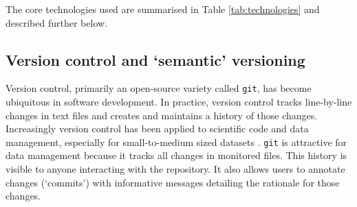 \documentclass[a4paper,11pt]{article}
\begin{document}
The core technologies used are summarised in Table \ref{tab:technologies} and described further below.

\subsection{Version control and `semantic' versioning}



Version control, primarily an open-source variety called \texttt{git}, has become ubiquitous in software development. In practice, version control tracks line-by-line changes in text files and creates and maintains a history of those changes. Increasingly version control has been applied to scientific code and data management, especially for small-to-medium sized datasets \citep{Ram-2013, Perkel-2016}. \texttt{git} is attractive for data management because it tracks all changes in monitored files. This history is visible to anyone interacting with the repository. It also allows users to annotate changes (`commits') with informative messages detailing the rationale for those changes.  
\end{document}
